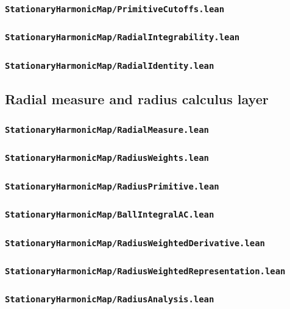 \documentclass[reqno,11pt]{amsart}
\numberwithin{equation}{section}
\theoremstyle{plain}
\theoremstyle{definition}
\theoremstyle{remark}
\begin{document}
\subsubsection*{\texttt{StationaryHarmonicMap/PrimitiveCutoffs.lean}}
\subsubsection*{\texttt{StationaryHarmonicMap/RadialIntegrability.lean}}
\subsubsection*{\texttt{StationaryHarmonicMap/RadialIdentity.lean}}

\subsection{Radial measure and radius calculus layer}

\subsubsection*{\texttt{StationaryHarmonicMap/RadialMeasure.lean}}
\subsubsection*{\texttt{StationaryHarmonicMap/RadiusWeights.lean}}
\subsubsection*{\texttt{StationaryHarmonicMap/RadiusPrimitive.lean}}
\subsubsection*{\texttt{StationaryHarmonicMap/BallIntegralAC.lean}}
\subsubsection*{\texttt{StationaryHarmonicMap/RadiusWeightedDerivative.lean}}
\subsubsection*{\texttt{StationaryHarmonicMap/RadiusWeightedRepresentation.lean}}
\subsubsection*{\texttt{StationaryHarmonicMap/RadiusAnalysis.lean}}
\end{document}
